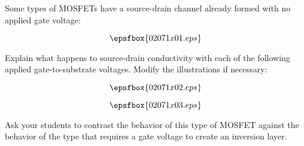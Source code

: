 

Some types of MOSFETs have a source-drain channel already formed with no applied gate voltage:

$$\epsfbox{02071x01.eps}$$

Explain what happens to source-drain conductivity with each of the following applied gate-to-substrate voltages.  Modify the illustrations if necessary:

$$\epsfbox{02071x02.eps}$$







$$\epsfbox{02071x03.eps}$$







Ask your students to contrast the behavior of this type of MOSFET against the behavior of the type that requires a gate voltage to create an inversion layer.




